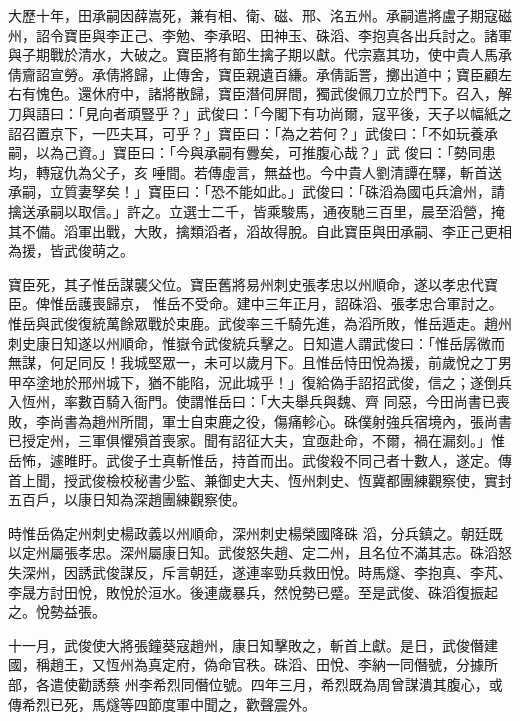 \begin{pinyinscope}
 大歷十年，田承嗣因薛嵩死，兼有相、衛、磁、邢、洺五州。承嗣遣將盧子期寇磁州，詔令寶臣與李正己、李勉、李承昭、田神玉、硃滔、李抱真各出兵討之。諸軍
 與子期戰於清水，大破之。寶臣將有節生擒子期以獻。代宗嘉其功，使中貴人馬承倩齎詔宣勞。承倩將歸，止傳舍，寶臣親遺百縑。承倩詬詈，擲出道中；寶臣顧左右有愧色。還休府中，諸將散歸，寶臣潛伺屏間，獨武俊佩刀立於門下。召入，解刀與語曰：「見向者頑豎乎？」武俊曰：「今閣下有功尚爾，寇平後，天子以幅紙之詔召置京下，一匹夫耳，可乎？」寶臣曰：「為之若何？」武俊曰：「不如玩養承嗣，以為己資。」寶臣曰：「今與承嗣有釁矣，可推腹心哉？」武
 俊曰：「勢同患均，轉寇仇為父子，亥唾間。若傳虛言，無益也。今中貴人劉清譚在驛，斬首送承嗣，立質妻孥矣！」寶臣曰：「恐不能如此。」武俊曰：「硃滔為國屯兵滄州，請擒送承嗣以取信。」許之。立選士二千，皆乘駿馬，通夜馳三百里，晨至滔營，掩其不備。滔軍出戰，大敗，擒類滔者，滔故得脫。自此寶臣與田承嗣、李正己更相為援，皆武俊萌之。



 寶臣死，其子惟岳謀襲父位。寶臣舊將易州刺史張孝忠以州順命，遂以孝忠代寶臣。俾惟岳護喪歸京，
 惟岳不受命。建中三年正月，詔硃滔、張孝忠合軍討之。惟岳與武俊復統萬餘眾戰於束鹿。武俊率三千騎先進，為滔所敗，惟岳遁走。趙州刺史康日知遂以州順命，惟嶽令武俊統兵擊之。日知遣人謂武俊曰：「惟岳孱微而無謀，何足同反！我城堅眾一，未可以歲月下。且惟岳恃田悅為援，前歲悅之丁男甲卒塗地於邢州城下，猶不能陷，況此城乎！」復給偽手詔招武俊，信之；遂倒兵入恆州，率數百騎入衙門。使謂惟岳曰：「大夫舉兵與魏、齊
 同惡，今田尚書已喪敗，李尚書為趙州所間，軍士自束鹿之役，傷痛軫心。硃僕射強兵宿境內，張尚書已授定州，三軍俱懼殞首喪家。聞有詔征大夫，宜亟赴命，不爾，禍在漏刻。」惟岳怖，遽睢盱。武俊子士真斬惟岳，持首而出。武俊殺不同己者十數人，遂定。傳首上聞，授武俊檢校秘書少監、兼御史大夫、恆州刺史、恆冀都團練觀察使，實封五百戶，以康日知為深趙團練觀察使。



 時惟岳偽定州刺史楊政義以州順命，深州刺史楊榮國降硃
 滔，分兵鎮之。朝廷既以定州屬張孝忠。深州屬康日知。武俊怒失趙、定二州，且名位不滿其志。硃滔怒失深州，因誘武俊謀反，斥言朝廷，遂連率勁兵救田悅。時馬燧、李抱真、李芃、李晟方討田悅，敗悅於洹水。後連歲暴兵，然悅勢已蹙。至是武俊、硃滔復振起之。悅勢益張。



 十一月，武俊使大將張鐘葵寇趙州，康日知擊敗之，斬首上獻。是日，武俊僭建國，稱趙王，又恆州為真定府，偽命官秩。硃滔、田悅、李納一同僭號，分據所部，各遣使勸誘蔡
 州李希烈同僭位號。四年三月，希烈既為周曾謀潰其腹心，或傳希烈已死，馬燧等四節度軍中聞之，歡聲震外。




\end{pinyinscope}
